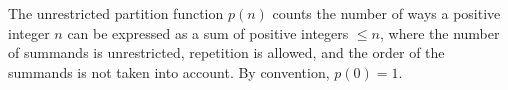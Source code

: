 The unrestricted partition function $p(n)$ counts the number of ways a positive integer $n$ can be expressed as a sum of positive integers $\leq n$, where the number of summands is unrestricted, repetition is allowed, and the order of the summands is not taken into account. By convention, $p(0) = 1$.
